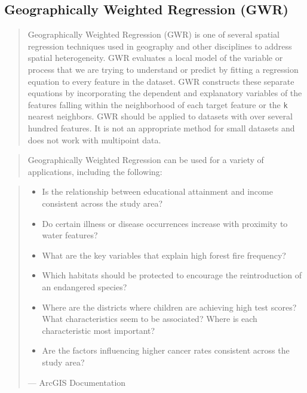 \documentclass[
  11pt,
]{book}
\providecommand{\tightlist}{%
  \setlength{\itemsep}{0pt}\setlength{\parskip}{0pt}}
\begin{document}
\hypertarget{geographically-weighted-regression-gwr}{%
\subsection{Geographically Weighted Regression (GWR)}\label{geographically-weighted-regression-gwr}}

\begin{quote}
Geographically Weighted Regression (GWR) is one of several spatial regression techniques used in geography and other disciplines to address spatial heterogeneity. GWR evaluates a local model of the variable or process that we are trying to understand or predict by fitting a regression equation to every feature in the dataset. GWR constructs these separate equations by incorporating the dependent and explanatory variables of the features falling within the neighborhood of each target feature or the \texttt{k} nearest neighbors. GWR should be applied to datasets with over several hundred features. It is not an appropriate method for small datasets and does not work with multipoint data.
\end{quote}

\begin{quote}
Geographically Weighted Regression can be used for a variety of applications, including the following:
\end{quote}

\begin{quote}
\begin{itemize}
\tightlist
\item
  Is the relationship between educational attainment and income consistent across the study area?
\item
  Do certain illness or disease occurrences increase with proximity to water features?
\item
  What are the key variables that explain high forest fire frequency?
\item
  Which habitats should be protected to encourage the reintroduction of an endangered species?
\item
  Where are the districts where children are achieving high test scores? What characteristics seem to be associated? Where is each characteristic most important?
\item
  Are the factors influencing higher cancer rates consistent across the study area?
\end{itemize}

--- ArcGIS Documentation
\end{quote}
\end{document}
